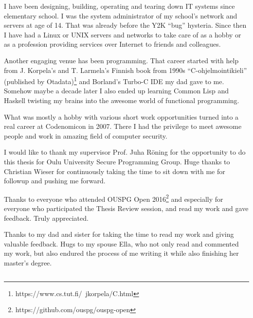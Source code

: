 \documentclass[a4paper,12pt,titlepage]{dithesis}
\begin{document}

I have been designing, building, operating and tearing down IT systems
since elementary school. I was the system administrator of my school's
network and servers at age of 14. That was already before the Y2K
``bug'' hysteria. Since then I have had a Linux or UNIX servers and
networks to take care of as a hobby or as a profession providing
services over Internet to friends and colleagues.

Another engaging venue has been programming. That career started with
help from J. Korpela's and T. Larmela's Finnish book from 1990s
``C-ohjelmointikieli'' (published by
Otadata)\footnote{https://www.cs.tut.fi/~jkorpela/C.html} and
Borland's Turbo-C IDE my dad gave to me. Somehow maybe a decade later
I also ended up learning Common Lisp and Haskell twisting my brains
into the awesome world of functional programming.

What was mostly a hobby with various short work opportunities turned
into a real career at Codenomicon in 2007. There I had the privilege
to meet awesome people and work in amazing field of computer security.

I would like to thank my supervisor Prof. Juha Röning for the
opportunity to do this thesis for Oulu University Secure Programming
Group. Huge thanks to Christian Wieser for continuously taking the
time to sit down with me for followup and pushing me forward.

Thanks to everyone who attended OUSPG Open
2016\footnote{https://github.com/ouspg/ouspg-open} and especially for
everyone who participated the Thesis Review session, and read my work
and gave feedback. Truly appreciated.

Thanks to my dad and sister for taking the time to read my work and
giving valuable feedback. Hugs to my spouse Ella, who not only read
and commented my work, but also endured the process of me writing it
while also finishing her master's degree.




\setlongtables
\begin{longtable}[l]{p{3cm}p{}}
  
\end{longtable}
\setcounter{table}{0}
\end{document}
